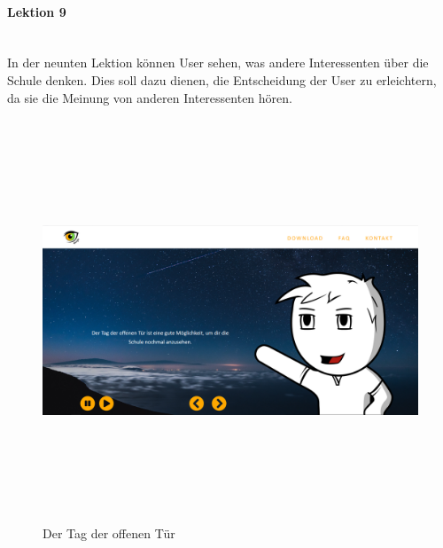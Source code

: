 \paragraph{Lektion 9} \leavevmode \\
In der neunten Lektion können User sehen, was andere Interessenten über die Schule denken. Dies soll dazu dienen, die Entscheidung der User zu erleichtern, da sie die Meinung von anderen Interessenten hören.
\begin{figure} [h]
	\centering
\includegraphics[width=12cm,height=12cm,keepaspectratio]{webseite_abb20} 
	\caption{Der Tag der offenen Tür}
\end{figure}
